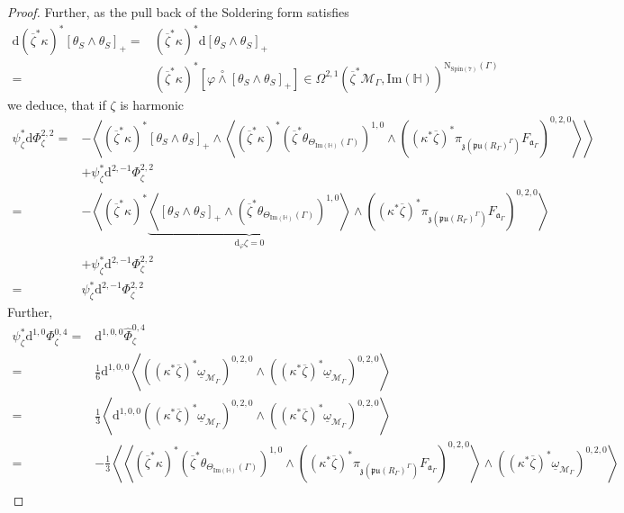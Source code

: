 \documentclass[10pt,a4paper]{amsart}
\newcommand{\m}[1]{{\mathrm{#1}}}
\begin{document}
\begin{proof}
Further, as the pull back of the Soldering form satisfies
\begin{align*}
    \m{d}(\overline{\zeta}^*\kappa)^*\left[\theta_{S}\wedge\theta_S\right]_+=&(\overline{\zeta}^*\kappa)^*\m{d}\left[\theta_{S}\wedge\theta_S\right]_+\\
    =&(\overline{\zeta}^*\kappa)^*[\varphi\overset{\circ}{\wedge}\left[\theta_{S}\wedge\theta_S\right]_+]\in\Omega^{2,1}(\overline{\zeta}^*\mathcal{M}_\Gamma,\m{Im}(\mathbb{H}))^{\m{N}_{\m{Spin}(7)}(\Gamma)}
\end{align*}
we deduce, that if $\zeta$ is harmonic
\begin{align*}
    \psi_\zeta^*\m{d}\Phi^{2,2}_\zeta=&-\left<(\overline{\zeta}^*\kappa)^*\left[\theta_{S}\wedge\theta_S\right]_+\wedge\left<(\overline{\zeta}^*\kappa)^*(\overline{\zeta}^*\theta_{\Theta_{\m{Im}(\mathbb{H})}(\Gamma)})^{1,0}\wedge((\kappa^*\overline{\zeta})^*\pi_{\mathfrak{z}(\mathfrak{pu}(R_\Gamma)^{\Gamma})}F_{\mathfrak{a}_\Gamma})^{0,2,0}\right>\right>\\
    &+\psi^*_\zeta\m{d}^{2,-1}\Phi^{2,2}_\zeta\\
    =&-\left<(\overline{\zeta}^*\kappa)^*\underbrace{\left<\left[\theta_{S}\wedge\theta_S\right]_+\wedge(\overline{\zeta}^*\theta_{\Theta_{\m{Im}(\mathbb{H})}(\Gamma)})^{1,0}\right>}_{\m{d}_{\varphi}\zeta=0}\wedge((\kappa^*\overline{\zeta})^*\pi_{\mathfrak{z}(\mathfrak{pu}(R_\Gamma)^{\Gamma})}F_{\mathfrak{a}_\Gamma})^{0,2,0}\right>\\
    &+\psi^*_\zeta\m{d}^{2,-1}\Phi^{2,2}_\zeta\\
    =&\psi^*_\zeta\m{d}^{2,-1}\Phi^{2,2}_\zeta
\end{align*}
Further,
\begin{align*}
    \psi_\zeta^*\m{d}^{1,0}\Phi_\zeta^{0,4}=&\m{d}^{1,0,0}\hat{\Phi}_\zeta^{0,4}\\
    =&\frac{1}{6}\m{d}^{1,0,0}\left<((\kappa^*\overline{\zeta})^*\underline{\omega}_{\mathcal{M}_\Gamma})^{0,2,0}\wedge((\kappa^*\overline{\zeta})^*\underline{\omega}_{\mathcal{M}_\Gamma})^{0,2,0}\right>\\
    =&\frac{1}{3}\left<\m{d}^{1,0,0}((\kappa^*\overline{\zeta})^*\underline{\omega}_{\mathcal{M}_\Gamma})^{0,2,0}\wedge((\kappa^*\overline{\zeta})^*\underline{\omega}_{\mathcal{M}_\Gamma})^{0,2,0}\right>\\
    =&-\frac{1}{3}\left<\left<(\overline{\zeta}^*\kappa)^*(\overline{\zeta}^*\theta_{\Theta_{\m{Im}(\mathbb{H})}(\Gamma)})^{1,0}\wedge((\kappa^*\overline{\zeta})^*\pi_{\mathfrak{z}(\mathfrak{pu}(R_\Gamma)^{\Gamma})}F_{\mathfrak{a}_\Gamma})^{0,2,0}\right>\wedge((\kappa^*\overline{\zeta})^*\underline{\omega}_{\mathcal{M}_\Gamma})^{0,2,0}\right>\\

\end{align*}
\end{proof}
\end{document}
